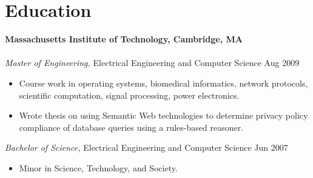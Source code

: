 \section{Education}

\textbf{Massachusetts Institute of Technology, Cambridge, MA} \\
\\
\textit{Master of Engineering,} Electrical Engineering and Computer Science
\hfill Aug 2009
\begin{itemize} \itemsep -2pt %
\item Course work in operating systems, biomedical informatics, network
      protocols, scientific computation, signal processing, power electronics.
\item Wrote thesis on using Semantic Web technologies to determine privacy
      policy compliance of database queries using a rules-based reasoner.
\end{itemize}
\textit{Bachelor of Science,} Electrical Engineering and Computer Science
\hfill Jun 2007
\begin{itemize} \itemsep -2pt %
\item Minor in Science, Technology, and Society.
\end{itemize}

